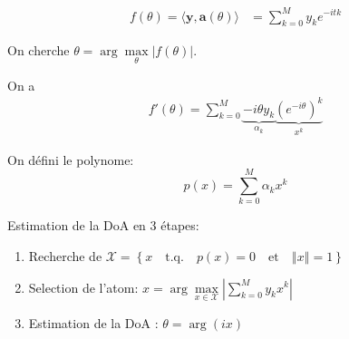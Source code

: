 \documentclass{article}
\renewcommand{\vec}[1]{\ensuremath{\bm{#1}}}
\newcommand{\y}{\vec{y}}
\newcommand{\atom}{\ensuremath{\vec{a}}}
\newcommand{\abs}[1]{\ensuremath{\left|#1\right|}}
\newcommand{\norm}[1]{\ensuremath{\left\Vert#1\right\Vert}}
\newcommand{\scalprod}[2]{\ensuremath{\langle#1,#2\rangle}}
\newcommand{\aMl}[1]{\ensuremath{\arg\max\limits_{#1}}}
\begin{document}
	\begin{align}
		f(\theta)=\scalprod{\y}{\atom(\theta)} & = \sum\limits_{k=0}^M y_k e^{-itk}
	\end{align}
	
	On cherche $\theta=\aMl{\theta}\abs{f(\theta)}$.
	
	On a
	\begin{align}
		f'(\theta) = \sum\limits_{k=0}^M \underbrace{-i\theta y_k}_{\alpha_k} \underbrace{(e^{-i\theta})^k}_{x^k}
	\end{align}
	
	On défini le polynome:
	\begin{equation*}
		p(x) = \sum\limits_{k=0}^M \alpha_k x^k
	\end{equation*}

	Estimation de la DoA en 3 étapes:
	\begin{enumerate}
		\item Recherche de $\mathcal{X}=\left\{x\quad\text{t.q.}\quad p(x)=0\quad\text{et}\quad\norm{x}=1 \right\}$
		\item Selection de l'atom: $x=\aMl{x\in\mathcal{X}} \abs{\sum\limits_{k=0}^M y_k x^k}$
		\item Estimation de la DoA : $\theta = \arg(ix)$
	\end{enumerate}
\end{document}
